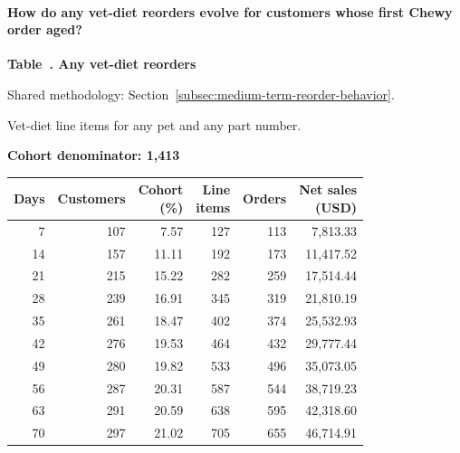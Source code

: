 \paragraph{How do any vet-diet reorders evolve for customers whose first Chewy order aged?}

\label{tab:financial-opportunity-new-chewy-any-vet-diet}
\par\smallskip\noindent\parbox[t][2\baselineskip][t]{\linewidth}{\raggedright\textbf{Table~\thetable. Any vet-diet reorders}}
\par\raggedright\footnotesize Shared methodology: Section~\ref{subsec:medium-term-reorder-behavior}.
\par\noindent\parbox[t][2\baselineskip][t]{\linewidth}{\raggedright Vet-diet line items for any pet and any part number.}
\par\noindent\textbf{Cohort denominator: 1,413}
\par\centering\footnotesize
\setlength{\tabcolsep}{2pt}
\begin{tabular}{rrrrrr}\toprule
Days & Customers & \shortstack{Cohort\\(\%)} & \shortstack{Line\\items} & Orders & \shortstack{Net sales\\(USD)} \\ \midrule

7 & 107 & 7.57 & 127 & 113 & 7,813.33 \\

14 & 157 & 11.11 & 192 & 173 & 11,417.52 \\

21 & 215 & 15.22 & 282 & 259 & 17,514.44 \\

28 & 239 & 16.91 & 345 & 319 & 21,810.19 \\

35 & 261 & 18.47 & 402 & 374 & 25,532.93 \\

42 & 276 & 19.53 & 464 & 432 & 29,777.44 \\

49 & 280 & 19.82 & 533 & 496 & 35,073.05 \\

56 & 287 & 20.31 & 587 & 544 & 38,719.23 \\

63 & 291 & 20.59 & 638 & 595 & 42,318.60 \\

70 & 297 & 21.02 & 705 & 655 & 46,714.91 \\
\bottomrule\end{tabular}\par

